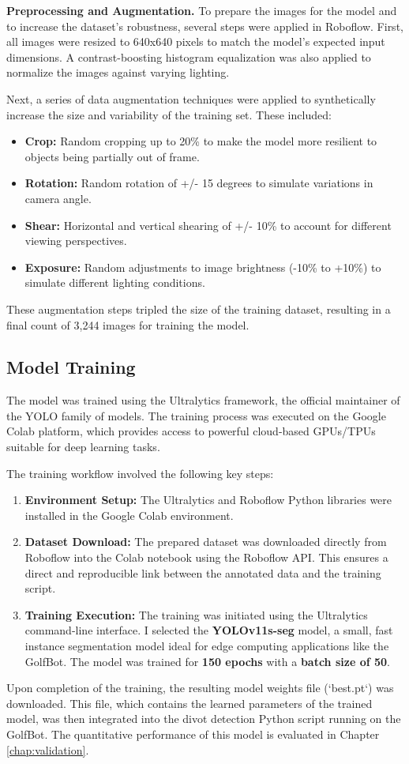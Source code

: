 \textbf{Preprocessing and Augmentation.}
To prepare the images for the model and to increase the dataset's robustness, several steps were applied in Roboflow. First, all images were resized to 640x640 pixels to match the model's expected input dimensions. A contrast-boosting histogram equalization was also applied to normalize the images against varying lighting.

Next, a series of data augmentation techniques were applied to synthetically increase the size and variability of the training set. These included:
\begin{itemize}
    \item \textbf{Crop:} Random cropping up to 20\% to make the model more resilient to objects being partially out of frame.
    \item \textbf{Rotation:} Random rotation of +/- 15 degrees to simulate variations in camera angle.
    \item \textbf{Shear:} Horizontal and vertical shearing of +/- 10\% to account for different viewing perspectives.
    \item \textbf{Exposure:} Random adjustments to image brightness (-10\% to +10\%) to simulate different lighting conditions.
\end{itemize}
These augmentation steps tripled the size of the training dataset, resulting in a final count of 3,244 images for training the model.

\subsection{Model Training}
\label{ssec:cv_training}
The model was trained using the Ultralytics framework, the official maintainer of the YOLO  family of models. The training process was executed on the Google Colab platform, which provides access to powerful cloud-based GPUs/TPUs suitable for deep learning tasks.

The training workflow involved the following key steps:
\begin{enumerate}
    \item \textbf{Environment Setup:} The Ultralytics and Roboflow Python libraries were installed in the Google Colab environment.
    \item \textbf{Dataset Download:} The prepared dataset was downloaded directly from Roboflow into the Colab notebook using the Roboflow API. This ensures a direct and reproducible link between the annotated data and the training script.
    \item \textbf{Training Execution:} The training was initiated using the Ultralytics command-line interface. I selected the \textbf{YOLOv11s-seg} model, a small, fast instance segmentation model ideal for edge computing applications like the GolfBot. The model was trained for \textbf{150 epochs} with a \textbf{batch size of 50}.
\end{enumerate}
Upon completion of the training, the resulting model weights file (`best.pt`) was downloaded. This file, which contains the learned parameters of the trained model, was then integrated into the divot detection Python script running on the GolfBot. The quantitative performance of this model is evaluated in Chapter \ref{chap:validation}.

